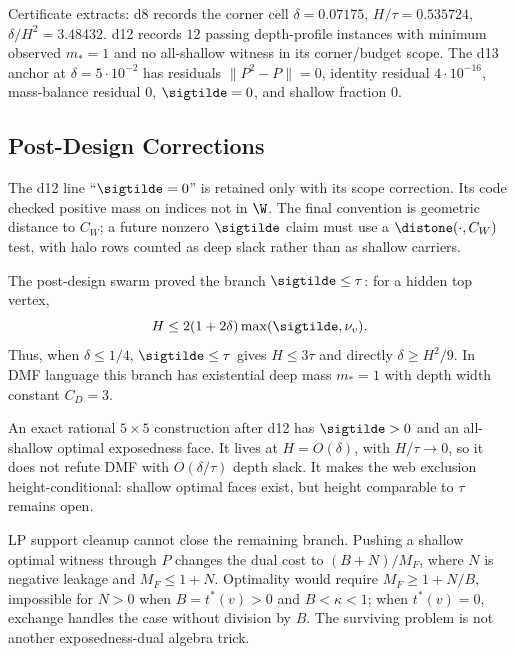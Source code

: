 \numbadge Certificate extracts: d8 records the corner cell
\(\delta=0.07175\), \(H/\tau=0.535724\), \(\delta/H^2=3.48432\).
d12 records \(12\) passing depth-profile instances with minimum observed
\(m_*=1\) and no all-shallow witness in its corner/budget scope.  The d13
anchor at \(\delta=5\cdot10^{-2}\) has residuals
\(\|P^2-P\|=0\), identity residual \(4\cdot10^{-16}\), mass-balance residual
\(0\), \(\sigtilde=0\), and shallow fraction \(0\).

\subsection{Post-Design Corrections}

\begin{remark}
\modauditbadge The d12 line ``\(\sigtilde=0\)'' is retained only with its
scope correction.  Its code checked positive mass on indices not in \(\W\).
The final convention is geometric distance to \(C_W\); a future nonzero
\(\sigtilde\) claim must use a \(\distone(\cdot,C_W)\) test, with halo rows
counted as deep slack rather than as shallow carriers.
\end{remark}

\begin{remark}
\provedbadge The post-design swarm proved the branch
\(\sigtilde\le\tau\): for a hidden top vertex,
\[
  H\le 2(1+2\delta)\max(\sigtilde,\nu_v).
\]
Thus, when \(\delta\le1/4\), \(\sigtilde\le\tau\) gives \(H\le3\tau\) and
directly \(\delta\ge H^2/9\).  In DMF language this branch has existential
deep mass \(m_*=1\) with depth width constant \(C_D=3\).
\end{remark}

\begin{remark}
\modauditbadge An exact rational \(5\times5\) construction after d12 has
\(\sigtilde>0\) and an all-shallow optimal exposedness face.  It lives at
\(H=O(\delta)\), with \(H/\tau\to0\), so it does not refute DMF with
\(O(\delta/\tau)\) depth slack.  It makes the web exclusion height-conditional:
shallow optimal faces exist, but height comparable to \(\tau\) remains open.
\end{remark}

\begin{remark}
\provedbadge LP support cleanup cannot close the remaining branch.  Pushing a
shallow optimal witness through \(P\) changes the dual cost to
\((B+N)/M_F\), where \(N\) is negative leakage and \(M_F\le1+N\).  Optimality
would require \(M_F\ge1+N/B\), impossible for \(N>0\) when \(B=t^*(v)>0\) and
\(B<\kappa<1\); when \(t^*(v)=0\), exchange handles the case without division
by \(B\).  The surviving problem is not another exposedness-dual algebra trick.
\end{remark}

